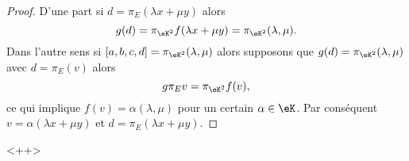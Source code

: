 \begin{proof}
    D'une part si \( d=\pi_E(\lambda x+\mu y)\) alors
    \begin{equation}
        g(d)=\pi_{\eK^2}f(\lambda x+\mu y)=\pi_{\eK^2}(\lambda,\mu).
    \end{equation}
    Dans l'autre sens si \( [a,b,c,d]=\pi_{\eK^2}(\lambda,\mu)\) alors supposons que \( g(d)=\pi_{\eK^2}(\lambda,\mu)\) avec \( d=\pi_E(v)\) alors
    \begin{equation}
        g\pi_Ev=\pi_{\eK^2}f(v),
    \end{equation}
    ce qui implique \( f(v)=\alpha(\lambda,\mu)\) pour un certain \( \alpha\in \eK\). Par conséquent \( v=\alpha(\lambda x+\mu y)\) et \( d=\pi_E(\lambda x+\mu y)\).
\end{proof}
<++>
